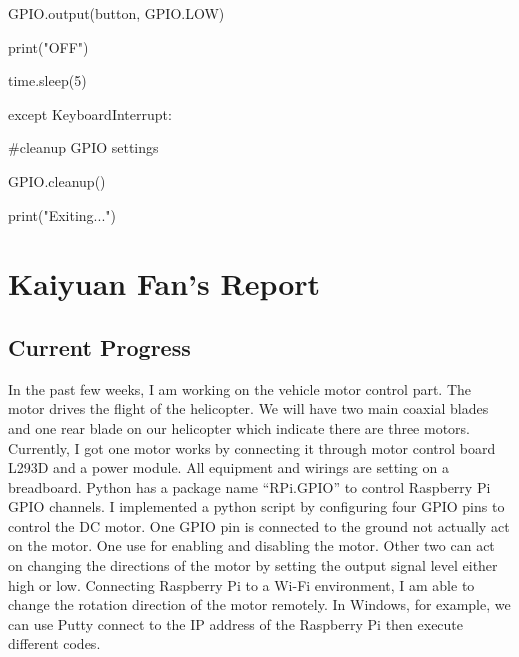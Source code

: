 \documentclass[onecolumn, draftclsnofoot,10pt, compsoc]{IEEEtran}
\begin{document}
				\begin{flushleft}
				\quad \quad GPIO.output(button, GPIO.LOW)
				\end{flushleft}
				\begin{flushleft}
				\quad \quad print("OFF")
				\end{flushleft}
				\begin{flushleft}
				\quad \quad time.sleep(5)
				\end{flushleft}
\begin{flushleft}
except KeyboardInterrupt:
\end{flushleft}
	\begin{flushleft}
		\quad \#cleanup GPIO settings
		\end{flushleft}
		\begin{flushleft}
		\quad GPIO.cleanup()
		\end{flushleft}
		\begin{flushleft}
		\quad print("Exiting...")
	\end{flushleft}







\section{Kaiyuan Fan's Report}


\subsection{Current Progress}


In the past few weeks, I am working on the vehicle motor control part. The motor drives the flight of the helicopter. We will have two main coaxial blades and one rear blade on our helicopter which indicate there are three motors. Currently, I got one motor works by connecting it through motor control board L293D and a power module. All equipment and wirings are setting on a breadboard. Python has a package name “RPi.GPIO” to control Raspberry Pi GPIO channels. I implemented a python script by configuring four GPIO pins to control the DC motor. One GPIO pin is connected to the ground not actually act on the motor. One use for enabling and disabling the motor. Other two can act on changing the directions of the motor by setting the output signal level either high or low. Connecting Raspberry Pi to a Wi-Fi environment, I am able to change the rotation direction of the motor remotely. In Windows, for example, we can use Putty connect to the IP address of the Raspberry Pi then execute different codes.
\end{document}
